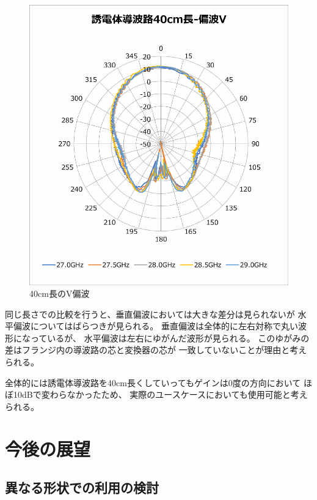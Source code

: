 \documentclass[technicalreport]{ieicej}
\begin{document}
\begin{figure}[tb]
  \begin{center}
    \includegraphics[bb=0 0 408 430, width=0.9\linewidth]{img/waveguide-40cm-v.pdf}
    \caption{40cm長のV偏波}
    \label{fig:40cm-v}
  \end{center}
\end{figure}


同じ長さでの比較を行うと、垂直偏波においては大きな差分は見られないが
水平偏波についてはばらつきが見られる。
垂直偏波は全体的に左右対称で丸い波形になっているが、
水平偏波は左右にゆがんだ波形が見られる。
このゆがみの差はフランジ内の導波路の芯と変換器の芯が
一致していないことが理由と考えられる。

全体的には誘電体導波路を40cm長くしていってもゲインは0度の方向において
ほぼ10dBで変わらなかったため、
実際のユースケースにおいても使用可能と考えられる。


\section{今後の展望}

\subsection{異なる形状での利用の検討}
\end{document}
